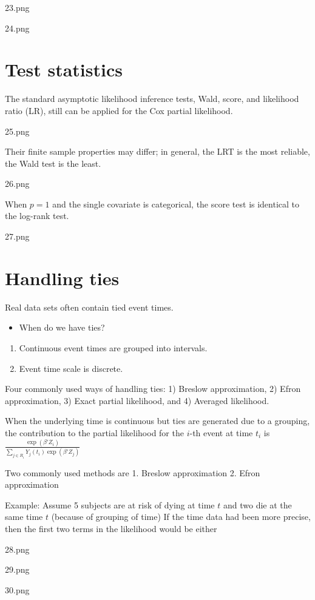\documentclass[
]{book}
\providecommand{\tightlist}{%
  \setlength{\itemsep}{0pt}\setlength{\parskip}{0pt}}
\theoremstyle{definition}
\theoremstyle{definition}
\theoremstyle{definition}
\theoremstyle{definition}
\theoremstyle{remark}
\begin{document}
23.png

24.png

\hypertarget{test-statistics}{%
\section{Test statistics}\label{test-statistics}}

The standard asymptotic likelihood inference tests, Wald, score, and likelihood ratio (LR), still can be applied for the Cox partial likelihood.

25.png

Their finite sample properties may differ; in general, the LRT is the most reliable, the Wald test is the least.

26.png

When \(p = 1\) and the single covariate is categorical, the score test is identical to the log-rank test.

27.png

\hypertarget{handling-ties}{%
\section{Handling ties}\label{handling-ties}}

Real data sets often contain tied event times.

\begin{itemize}
\tightlist
\item
  When do we have ties?
\end{itemize}

\begin{enumerate}
\def\labelenumi{\arabic{enumi}.}
\tightlist
\item
  Continuous event times are grouped into intervals.
\item
  Event time scale is discrete.
\end{enumerate}

Four commonly used ways of handling ties: 1) Breslow approximation, 2) Efron approximation, 3) Exact partial likelihood, and 4) Averaged likelihood.

When the underlying time is continuous but ties are generated due to a grouping, the contribution to the partial likelihood for the \(i\)-th event at time \(t_i\) is \(\frac{\exp(\beta ' Z_i)}{ \sum\limits_{j \in R_i} Y_j(t_i) \exp(\beta ' Z_j)}\)

Two commonly used methods are
1. Breslow approximation
2. Efron approximation

Example: Assume 5 subjects are at risk of dying at time \(t\) and two die at the same time \(t\) (because of grouping of time) If the time data had been more precise, then the first two terms in the likelihood would be either

28.png

29.png

30.png

  
\end{document}
